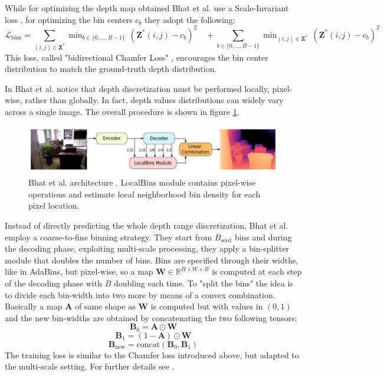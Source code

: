 While for optimizing the depth map obtained Bhat et al. use a Scale-Invariant loss \cite{Eigen}, for optimizing the bin centers $c_{b}$ they adopt the following:
\[
	\mathcal{L}_{\text{bins}} =
	\sum_{(i, j) \in \mathbf{Z}^{*}} \mathop{\text{min}}_{b \in \{0, \dotsc, B-1\}} \, (\mathbf{Z}^{*}(i, j) - c_{b})^{2} \quad+
	\sum_{b \in \{0, \dotsc, B-1\}} \mathop{\text{min}}_{(i, j) \in \mathbf{Z}^{*}} \, (\mathbf{Z}^{*}(i, j) - c_{b})^{2}
\]
This loss, called "bidirectional Chamfer Loss" \cite{AdaBins}, encourages the bin center distribution to match the ground-truth depth distribution.


In \cite{LocalBins} Bhat et al. notice that depth discretization must be performed locally, pixel-wise, rather than globally.
In fact, depth values distributions can widely vary across a single image.
The overall procedure is shown in figure \ref{fig:localbins}.

\begin{figure}
	\centering
	\includegraphics[scale=0.3]{figs/localbins}
	\caption{Bhat et al. architecture \cite{LocalBins}. LocalBins module contains pixel-wise operations and estimate local neighborhood bin density for each pixel location. \label{fig:localbins}}
\end{figure}

Instead of directly predicting the whole depth range discretization, Bhat et al. employ a coarse-to-fine binning strategy.
They start from $B_{\text{seed}}$ bins and during the decoding phase, exploiting multi-scale processing, they apply a bin-splitter module that doubles the number of bins.
Bins are specified through their widths, like in AdaBins, but pixel-wise, so a map $\mathbf{W} \in \mathbb{R}^{H \times W \times B}$ is computed at each step of the decoding phase with $B$ doubling each time.
To "split the bins" the idea is to divide each bin-width into two more by means of a convex combination.
Basically a map $\mathbf{A}$ of same shape as $\mathbf{W}$ is computed but with values in $(0, 1)$ and the new bin-widths are obtained by concatenating the two following tensors:
\[
	\mathbf{B}_{0} = \mathbf{A} \odot \mathbf{W}
\]\[
	\mathbf{B}_{1} = (1 - \mathbf{A}) \odot \mathbf{W}
\]\[
	\mathbf{B}_{\text{new}} = \text{concat} (\mathbf{B}_{0}, \mathbf{B}_{1})
\]
The training loss is similar to the Chamfer loss introduced above, but adapted to the multi-scale setting.
For further details see \cite{LocalBins}.


